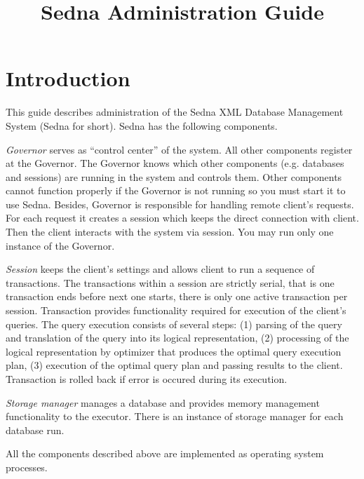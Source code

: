 \documentclass[a4paper,12pt]{article}
\title{Sedna Administration Guide}
\date{}
\begin{document}
\sloppy
\maketitle
\tableofcontents

\section{Introduction}
This guide describes administration of the Sedna XML Database Management System (Sedna for short). Sedna has the following components.

\emph{Governor} serves as  ``control center'' of the system. All other components register at the Governor. The Governor knows which other components (e.g. databases and sessions) are running in the system and controls them. Other components cannot function properly if the Governor is not running so you must start it to use Sedna. Besides, Governor is responsible for handling remote client's requests. For each request it creates a session which keeps the direct connection with client. Then the client interacts with the system via session. You may run only one instance of the Governor.


\emph{Session} keeps the client's settings and allows client to run a sequence of transactions. The transactions within a session are strictly serial, that is one transaction ends before next one starts, there is only one active transaction per session. Transaction provides functionality required for execution of the client's queries. The query execution consists of several steps: (1) parsing of the query and translation of the query into its logical representation, (2) processing of the logical representation by optimizer that produces the optimal query execution plan, (3) execution of the optimal query plan and passing results to the client. Transaction is rolled back if error is occured during its execution.

\emph{Storage manager} manages a database and provides memory management functionality to the executor. There is an instance of storage manager for each database run. 

All the components described above are implemented as operating system processes.
 

\end{document}
